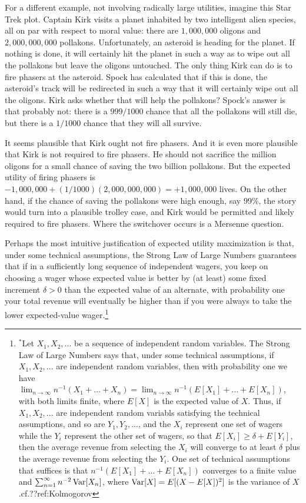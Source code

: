 For a different example, not involving radically large utilities, imagine this Star Trek plot. Captain Kirk visits a planet inhabited
by two intelligent alien species, all on par with respect to moral value: there are $1,000,000$ oligons and 
$2,000,000,000$ pollakons. Unfortunately, an asteroid is heading for the planet. If nothing is done, it will certainly hit the planet in such
a way as to wipe out all the pollakons but leave the oligons untouched. The only thing Kirk can do is to fire phasers at the asteroid. Spock has calculated that if this
is done, the asteroid's track will be redirected in such a way that it will certainly wipe out all the oligons. Kirk asks whether that will help 
the pollakons? Spock's answer is that probably not: there is a $999/1000$ chance that all the pollakons will still die, but there is
a $1/1000$ chance that they will all survive. 

It seems plausible that Kirk ought not fire phasers. And it is even more plausible that Kirk is not required to fire phasers.
He should not sacrifice the million oligons for a small chance of saving the two billion pollakons. 
But the expected utility of firing phasers is $-1,000,000+(1/1000)(2,000,000,000)=+1,000,000$ lives.
On the other hand, if the chance of saving the pollakons were high enough, say 99\%, the story would turn into 
a plausible trolley case, and Kirk would be permitted and likely required to fire phasers. Where the switchover
occurs is a Mersenne question.

Perhaps the most intuitive justification of expected utility maximization is that, under some technical assumptions,
the Strong Law of Large Numbers guarantees that if in a sufficiently long sequence of independent wagers, you keep 
on choosing a wager whose expected value is better by (at least) some fixed increment $\delta>0$ than the expected
value of an alternate, with probability one your total revenue will eventually be higher than if you were always to take the
lower expected-value wager.\footnote{$^*$Let $X_1,X_2,...$ be a sequence of independent random variables. The Strong 
Law of Large Numbers says that, under some technical assumptions, if $X_1,X_2,...$ are independent random variables, 
then with probability one we have $\lim_{n\to\infty} n^{-1} (X_1+\dots+X_n) = \lim_{n\to\infty} n^{-1} (E[X_1]+\dots+E[X_n])$, with both limits finite, where $E[X]$ is the expected value of $X$. Thus, if $X_1,X_2,...$ are independent random variabls satisfying the
technical assumptions, and so are $Y_1,Y_2,...$, and the $X_i$ represent one set of wagers while the $Y_i$ represent
the other set of wagers, so that $E[X_i] \ge \delta + E[Y_i]$, then the average revenue from selecting the $X_i$ will
converge to at least $\delta$ plus the average revenue from selecting the $Y_i$. One set of
technical assumptions that suffices is that $n^{-1}(E[X_1]+\dots+E[X_n])$ converges to a finite value and 
$\sum_{n=1}^\infty n^{-2} \operatorname{Var}[X_n]$, where $\operatorname{Var}[X]=E[(X-E[X])^2]$ is the variance of $X$.cf.??ref:Kolmogorov}

